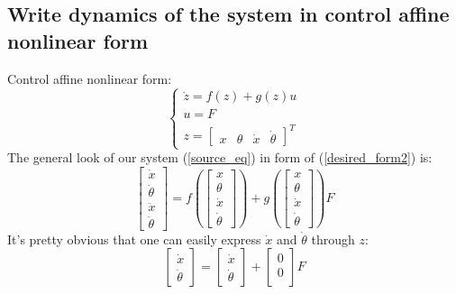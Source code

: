 \documentclass[a4paper,12pt]{article}
\begin{document}
    \subsection{Write dynamics of the system in control affine nonlinear form}
    Control affine nonlinear form:
    \begin{equation}\label{desired_form2}
        \begin{cases}
            \dot z = f(z) + g(z)u\\
            u=F\\
            z = 
            \begin{bmatrix}
                x&
                \theta&
                \dot x&
                \dot \theta    
            \end{bmatrix}^T
        \end{cases}
    \end{equation}
    The general look of our system (\ref{source_eq}) in form of (\ref{desired_form2})
    is:
    \begin{equation}
        \begin{bmatrix}
            \dot x\\
            \dot \theta\\
            \ddot x\\
            \ddot \theta    
        \end{bmatrix}
        =
        f(\begin{bmatrix}
            x\\
            \theta\\
            \dot x\\
            \dot \theta    
        \end{bmatrix})
        +
        g(\begin{bmatrix}
            x\\
            \theta\\
            \dot x\\
            \dot \theta    
        \end{bmatrix})F
    \end{equation}
    It's pretty obvious that one can easily express $\dot x$ and $\dot \theta$ 
    through $z$:
    \begin{equation}
        \begin{bmatrix}
            \dot x\\
            \dot \theta
        \end{bmatrix}
        =
        \begin{bmatrix}
            \dot x\\
            \dot \theta    
        \end{bmatrix}
        +
        \begin{bmatrix}
            0\\
            0\\    
        \end{bmatrix}F
    \end{equation}
\end{document}
